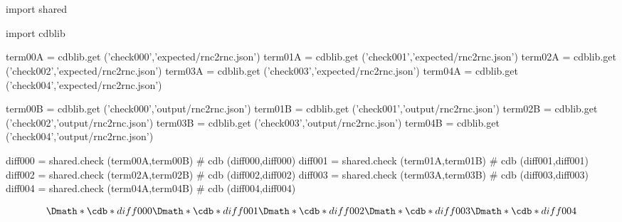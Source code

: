 \documentclass[12pt]{cdblatex}
\begin{document}
\section*{\jobname}


\begin{cadabra}
   import shared

   import cdblib

   term00A = cdblib.get ('check000','expected/rnc2rnc.json')
   term01A = cdblib.get ('check001','expected/rnc2rnc.json')
   term02A = cdblib.get ('check002','expected/rnc2rnc.json')
   term03A = cdblib.get ('check003','expected/rnc2rnc.json')
   term04A = cdblib.get ('check004','expected/rnc2rnc.json')

   term00B = cdblib.get ('check000','output/rnc2rnc.json')
   term01B = cdblib.get ('check001','output/rnc2rnc.json')
   term02B = cdblib.get ('check002','output/rnc2rnc.json')
   term03B = cdblib.get ('check003','output/rnc2rnc.json')
   term04B = cdblib.get ('check004','output/rnc2rnc.json')

   diff000 = shared.check (term00A,term00B)   # cdb (diff000,diff000)
   diff001 = shared.check (term01A,term01B)   # cdb (diff001,diff001)
   diff002 = shared.check (term02A,term02B)   # cdb (diff002,diff002)
   diff003 = shared.check (term03A,term03B)   # cdb (diff003,diff003)
   diff004 = shared.check (term04A,term04B)   # cdb (diff004,diff004)

\end{cadabra}

\begin{dgroup*}
   \Dmath*{ \cdb*{diff000} }
   \Dmath*{ \cdb*{diff001} }
   \Dmath*{ \cdb*{diff002} }
   \Dmath*{ \cdb*{diff003} }
   \Dmath*{ \cdb*{diff004} }
\end{dgroup*}
\end{document}
